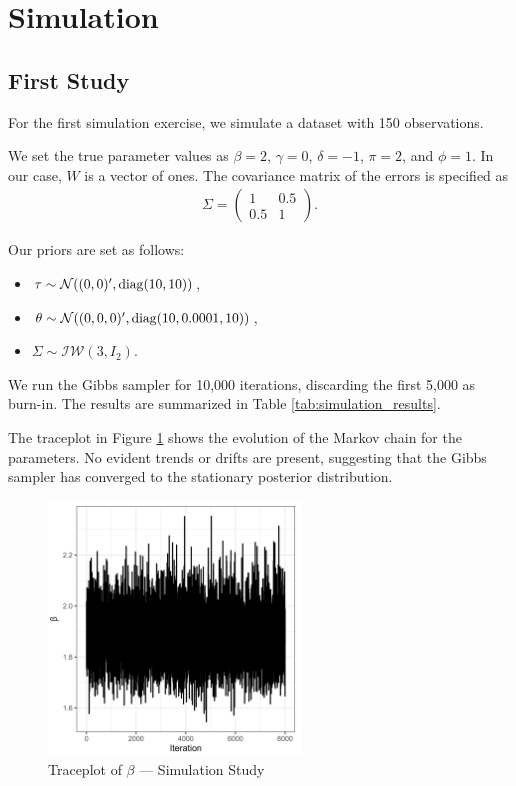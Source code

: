 \section{Simulation}
\subsection{First Study}

For the first simulation exercise, we simulate a dataset with 150 observations.

We set the true parameter values as $ \beta = 2 $, $ \gamma = 0 $, $ \delta = -1 $, $ \pi = 2 $, and $ \phi = 1 $. In our case, $W$ is a vector of ones. The covariance matrix of the errors is specified as
\begin{align*}
\Sigma = \begin{pmatrix}
1 & 0.5 \\
0.5 & 1
\end{pmatrix}.
\end{align*}

Our priors are set as follows: 
\begin{itemize}
    \item $\mathbf{\tau} \sim \mathcal{N}((0,0)', \mathrm{diag}(10,10))$,
    \item $\mathbf{\theta} \sim \mathcal{N}((0,0,0)', \mathrm{diag}(10, 0.0001, 10))$,
    \item $\Sigma \sim \mathcal{IW}(3, I_2)$.
\end{itemize}

We run the Gibbs sampler for 10,000 iterations, discarding the first 5,000 as burn-in. The results are summarized in Table \ref{tab:simulation_results}.



The traceplot in Figure \ref{fig:simulation_traceplot} shows the evolution of the Markov chain for the parameters. No evident trends or drifts are present, suggesting that the Gibbs sampler has converged to the stationary posterior distribution.

\begin{figure}[H]
\centering
\includegraphics[width=0.6\textwidth]{../figures/simulation/trace_beta.png}
\caption{Traceplot of $\beta$ --- Simulation Study}
\label{fig:simulation_traceplot}
\end{figure}

